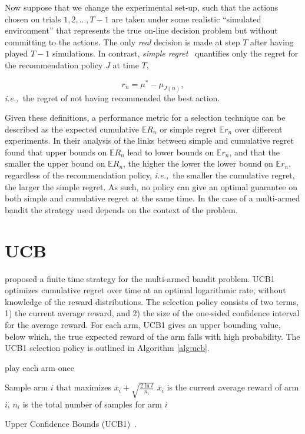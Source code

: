 \documentclass{kecsmstr}
\newcommand{\bE}{\mathbb{E}}
\newcommand{\ie}{{\it i.e.,}~}
\begin{document}
Now suppose that we change the experimental set-up, such that the actions chosen on trials $1, 2, \ldots, T-1$ are taken under some realistic ``simulated environment'' that represents the true on-line decision problem but without committing to the actions. The only \emph{real} decision is made at step $T$ after having played $T-1$ simulations. In contrast, \emph{simple regret}~ quantifies only the regret for the recommendation policy $J$ at time $T$,

\begin{equation}
r_n = \mu^* - \mu_{J(n)},
\end{equation}
\ie the regret of not having recommended the best action.

Given these definitions, a performance metric for a selection technique can be described as the expected cumulative $\bE R_n$ or simple regret $\bE r_n$ over different experiments. In their analysis of the links between simple and cumulative regret~ found that upper bounds on $\bE R_n$ lead to lower bounds on $\bE r_n$, and that the smaller the upper bound on $\bE R_n$, the higher the lower the lower bound on $\bE r_n$, regardless of the recommendation policy, \ie the smaller the cumulative regret, the larger the simple regret. As such, no policy can give an optimal guarantee on both simple and cumulative regret at the same time. In the case of a multi-armed bandit the strategy used depends on the context of the problem.

\section{UCB}
\label{sec:ucb}

 proposed a finite time strategy for the multi-armed bandit problem. UCB1 optimizes cumulative regret over time at an optimal logarithmic rate, without knowledge of the reward distributions. The selection policy consists of two terms, 1) the current average reward, and 2) the size of the one-sided confidence interval for the average reward. For each arm, UCB1 gives an upper bounding value, below which, the true expected reward of the arm falls with high probability. The UCB1 selection policy is outlined in Algorithm \ref{alg:ucb}.

\IncMargin{1em}
\begin{algorithm2e}[ht]
	\Indm
	\vspace{0.2cm}
	\Indp

	play each arm once 																				\;

	 {
		Sample arm $i$ that maximizes $\bar{x}_i + \displaystyle\sqrt{\frac{2\ln{t}}{n_i}}$ \newline
		$\bar{x}_i$ is the current average reward of arm $i$, $n_i$ is the total number of samples for arm $i$ \;
	}

  \caption[Upper Confidence Bounds (UCB1)]{Upper Confidence Bounds (UCB1)~\protect{}. \label{alg:ucb}}
\end{algorithm2e}
\DecMargin{1em}
\end{document}
